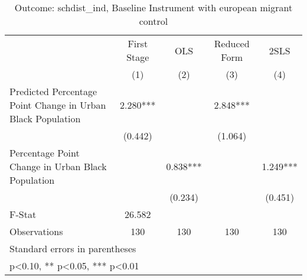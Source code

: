 \begin{table}[htbp]\centering
\def\sym#1{\ifmmode^{#1}\else\(^{#1}\)\fi}
\caption{Outcome: schdist\_ind, Baseline Instrument with european migrant control}
\begin{tabular}{l*{4}{c}}
\toprule
                    & First Stage   &         OLS   &Reduced Form   &        2SLS   \\
                    &\multicolumn{1}{c}{(1)}   &\multicolumn{1}{c}{(2)}   &\multicolumn{1}{c}{(3)}   &\multicolumn{1}{c}{(4)}   \\
\midrule
Predicted Percentage Point Change in Urban Black Population&       2.280***&               &       2.848***&               \\
                    &     (0.442)   &               &     (1.064)   &               \\
\addlinespace
Percentage Point Change in Urban Black Population&               &       0.838***&               &       1.249***\\
                    &               &     (0.234)   &               &     (0.451)   \\
\midrule
F-Stat              &      26.582   &               &               &               \\
Observations        &         130   &         130   &         130   &         130   \\
\bottomrule
\multicolumn{5}{l}{\footnotesize Standard errors in parentheses}\\
\multicolumn{5}{l}{\footnotesize * p<0.10, ** p<0.05, *** p<0.01}\\
\end{tabular}
\end{table}
